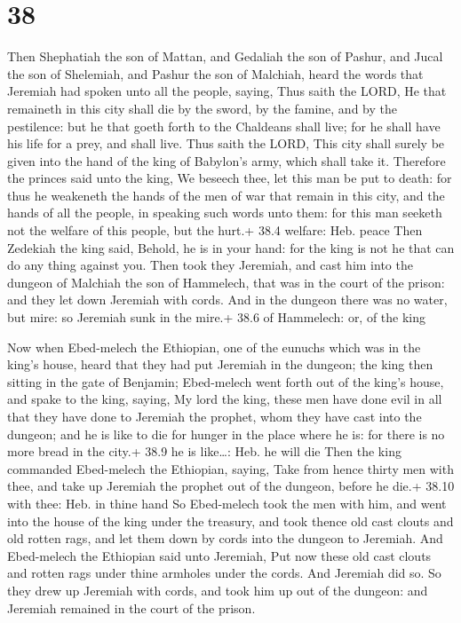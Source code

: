 \hypertarget{section-37}{%
\section{38}\label{section-37}}

 Then Shephatiah the son of Mattan, and Gedaliah the son of
Pashur, and Jucal the son of Shelemiah, and Pashur the son of Malchiah,
heard the words that Jeremiah had spoken unto all the people, saying,
 Thus saith the LORD, He that remaineth in this city shall
die by the sword, by the famine, and by the pestilence: but he that
goeth forth to the Chaldeans shall live; for he shall have his life for
a prey, and shall live.  Thus saith the LORD, This city
shall surely be given into the hand of the king of Babylon's army, which
shall take it.  Therefore the princes said unto the king, We
beseech thee, let this man be put to death: for thus he weakeneth the
hands of the men of war that remain in this city, and the hands of all
the people, in speaking such words unto them: for this man seeketh not
the welfare of this people, but the hurt.+ 38.4 welfare: Heb. peace
 Then Zedekiah the king said, Behold, he is in your hand:
for the king is not he that can do any thing against you. 
Then took they Jeremiah, and cast him into the dungeon of Malchiah the
son of Hammelech, that was in the court of the prison: and they let down
Jeremiah with cords. And in the dungeon there was no water, but mire: so
Jeremiah sunk in the mire.+ 38.6 of Hammelech: or, of the king

 Now when Ebed-melech the Ethiopian, one of the eunuchs
which was in the king's house, heard that they had put Jeremiah in the
dungeon; the king then sitting in the gate of Benjamin; 
Ebed-melech went forth out of the king's house, and spake to the king,
saying,  My lord the king, these men have done evil in all
that they have done to Jeremiah the prophet, whom they have cast into
the dungeon; and he is like to die for hunger in the place where he is:
for there is no more bread in the city.+ 38.9 he is like\ldots: Heb. he
will die  Then the king commanded Ebed-melech the
Ethiopian, saying, Take from hence thirty men with thee, and take up
Jeremiah the prophet out of the dungeon, before he die.+ 38.10 with
thee: Heb. in thine hand  So Ebed-melech took the men with
him, and went into the house of the king under the treasury, and took
thence old cast clouts and old rotten rags, and let them down by cords
into the dungeon to Jeremiah.  And Ebed-melech the
Ethiopian said unto Jeremiah, Put now these old cast clouts and rotten
rags under thine armholes under the cords. And Jeremiah did so.
 So they drew up Jeremiah with cords, and took him up out
of the dungeon: and Jeremiah remained in the court of the prison.

